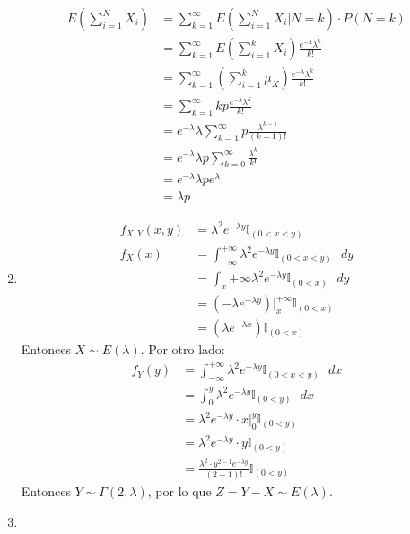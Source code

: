 \begin{enumerate}
		\begin{align*}
			E\left(\sum_{i=1}^{N}X_i\right)	& = \sum_{k=1}^{\infty} E\left(\sum_{i=1}^{N}X_i \Big| N=k\right) \cdot P(N=k)					\\
											& = \sum_{k=1}^{\infty} E\left(\sum_{i=1}^{k}X_i \right) \frac{e^{-\lambda}\lambda^k}{k!}		\\
											& = \sum_{k=1}^{\infty} \left(\sum_{i=1}^{k}\mu_X \right) \frac{e^{-\lambda}\lambda^k}{k!}		\\
											& = \sum_{k=1}^{\infty} kp \frac{e^{-\lambda}\lambda^k}{k!}						\\
											& = e^{-\lambda}\lambda \sum_{k=1}^{\infty} p \frac{\lambda^{k-1}}{(k-1)!}		\\
											& = e^{-\lambda}\lambda p\sum_{k=0}^{\infty} \frac{\lambda^k}{k!}				\\
											& = e^{-\lambda}\lambda p e^{\lambda}											\\
											& = \lambda p
		\end{align*}
	\item
		\begin{align*}
			f_{X,Y}(x,y)	& = \lambda^2e^{-\lambda y} \mathbb{I}_{(0<x<y)}	\\
			f_X(x)			& = \int_{-\infty}^{+\infty}\lambda^2e^{-\lambda y} \mathbb{I}_{(0<x<y)}\text{ }dy	\\
							& = \int_{x}{+\infty}\lambda^2e^{-\lambda y} \mathbb{I}_{(0<x)}\text{ }dy			\\
							& = (-\lambda e^{-\lambda y})\Big|_{x}^{+\infty} \mathbb{I}_{(0<x)}		\\
							& = (\lambda e^{-\lambda x}) \mathbb{I}_{(0<x)}
		\end{align*}
		Entonces $X\sim E(\lambda)$.
		Por otro lado:
		\begin{align*}
			f_Y(y)	& = \int_{-\infty}^{+\infty}\lambda^2e^{-\lambda y} \mathbb{I}_{(0<x<y)}\text{ }dx	\\
					& = \int_0^y\lambda^2e^{-\lambda y} \mathbb{I}_{(0<y)}\text{ }dx					\\
					& = \lambda^2e^{-\lambda y}\cdot x\Big|_0^y \mathbb{I}_{(0<y)}						\\
					& = \lambda^2e^{-\lambda y}\cdot y \mathbb{I}_{(0<y)}								\\
					& = \frac{\lambda^2\cdot y^{2-1} e^{-\lambda y}}{(2-1)!} \mathbb{I}_{(0<y)}
		\end{align*}
		Entonces $Y\sim \Gamma(2, \lambda)$, por lo que $Z = Y-X \sim E(\lambda)$. 
	\item

\end{enumerate}

